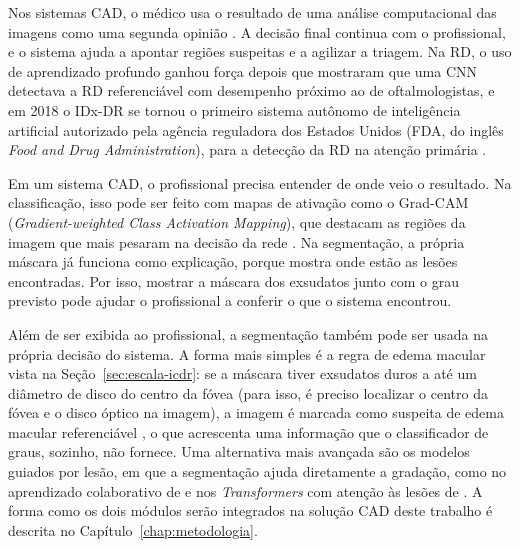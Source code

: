 Nos sistemas CAD, o médico usa o resultado de uma análise computacional das imagens como uma segunda opinião \cite{doi2007cad}. A decisão final continua com o profissional, e o sistema ajuda a apontar regiões suspeitas e a agilizar a triagem. Na RD, o uso de aprendizado profundo ganhou força depois que  mostraram que uma CNN detectava a RD referenciável com desempenho próximo ao de oftalmologistas, e em 2018 o IDx-DR se tornou o primeiro sistema autônomo de inteligência artificial autorizado pela agência reguladora dos Estados Unidos (FDA, do inglês \textit{Food and Drug Administration}), para a detecção da RD na atenção primária \cite{abramoff2018pivotal}.

Em um sistema CAD, o profissional precisa entender de onde veio o resultado. Na classificação, isso pode ser feito com mapas de ativação como o Grad-CAM (\textit{Gradient-weighted Class Activation Mapping}), que destacam as regiões da imagem que mais pesaram na decisão da rede \cite{selvaraju2017gradcam}. Na segmentação, a própria máscara já funciona como explicação, porque mostra onde estão as lesões encontradas. Por isso, mostrar a máscara dos exsudatos junto com o grau previsto pode ajudar o profissional a conferir o que o sistema encontrou.

Além de ser exibida ao profissional, a segmentação também pode ser usada na própria decisão do sistema. A forma mais simples é a regra de edema macular vista na Seção~\ref{sec:escala-icdr}: se a máscara tiver exsudatos duros a até um diâmetro de disco do centro da fóvea (para isso, é preciso localizar o centro da fóvea e o disco óptico na imagem), a imagem é marcada como suspeita de edema macular referenciável \cite{krause2018grader}, o que acrescenta uma informação que o classificador de graus, sozinho, não fornece. Uma alternativa mais avançada são os modelos guiados por lesão, em que a segmentação ajuda diretamente a gradação, como no aprendizado colaborativo de  e nos \textit{Transformers} com atenção às lesões de . A forma como os dois módulos serão integrados na solução CAD deste trabalho é descrita no Capítulo~\ref{chap:metodologia}.
